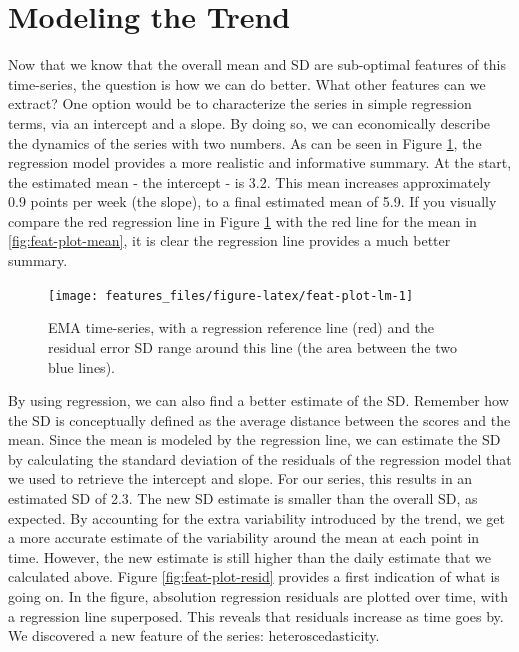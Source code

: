 \documentclass[]{book}
\begin{document}
\section{Modeling the Trend}\label{modeling-the-trend}

Now that we know that the overall mean and SD are sub-optimal features
of this time-series, the question is how we can do better. What other
features can we extract? One option would be to characterize the series
in simple regression terms, via an intercept and a slope. By doing so,
we can economically describe the dynamics of the series with two
numbers. As can be seen in Figure \ref{fig:feat-plot-lm}, the regression
model provides a more realistic and informative summary. At the start,
the estimated mean - the intercept - is 3.2. This mean increases
approximately 0.9 points per week (the slope), to a final estimated mean
of 5.9. If you visually compare the red regression line in Figure
\ref{fig:feat-plot-lm} with the red line for the mean in
\ref{fig:feat-plot-mean}, it is clear the regression line provides a
much better summary.

\begin{figure}

{\centering \texttt{[image: features\_files/figure-latex/feat-plot-lm-1]} 

}

\caption{EMA time-series, with a regression reference line (red) and the residual error SD range around this line (the area between the two blue lines).}\label{fig:feat-plot-lm}
\end{figure}

By using regression, we can also find a better estimate of the SD.
Remember how the SD is conceptually defined as the average distance
between the scores and the mean. Since the mean is modeled by the
regression line, we can estimate the SD by calculating the standard
deviation of the residuals of the regression model that we used to
retrieve the intercept and slope. For our series, this results in an
estimated SD of 2.3. The new SD estimate is smaller than the overall SD,
as expected. By accounting for the extra variability introduced by the
trend, we get a more accurate estimate of the variability around the
mean at each point in time. However, the new estimate is still higher
than the daily estimate that we calculated above. Figure
\ref{fig:feat-plot-resid} provides a first indication of what is going
on. In the figure, absolution regression residuals are plotted over
time, with a regression line superposed. This reveals that residuals
increase as time goes by. We discovered a new feature of the series:
heteroscedasticity.
\end{document}
